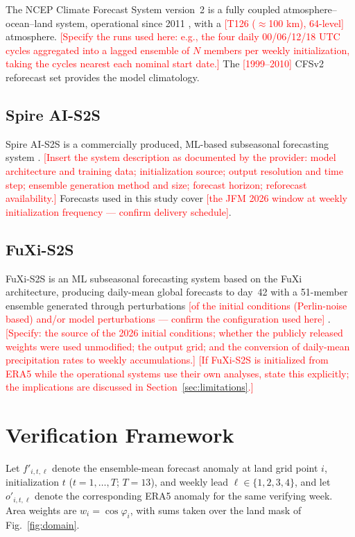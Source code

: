 \documentclass[11pt]{article}
\newcommand{\ph}[1]{\textcolor{red}{[#1]}}
\begin{document}
The NCEP Climate Forecast System version~2 is a fully coupled
atmosphere--ocean--land system, operational since 2011
\citep{saha2014}, with a \ph{T126 ($\approx$100 km), 64-level}
atmosphere. \ph{Specify the runs used here: e.g., the four daily
00/06/12/18 UTC cycles aggregated into a lagged ensemble of $N$ members
per weekly initialization, taking the cycles nearest each nominal
start date.} The \ph{1999--2010} CFSv2 reforecast set provides the
model climatology.

\subsection{Spire AI-S2S}\label{sec:spire}

Spire AI-S2S is a commercially produced, ML-based subseasonal
forecasting system \citep{spire2026}. \ph{Insert the system
description as documented by the provider: model architecture and
training data; initialization source; output resolution and time step;
ensemble generation method and size; forecast horizon; reforecast
availability.} Forecasts used in this study cover \ph{the JFM 2026
window at weekly initialization frequency --- confirm delivery
schedule}.

\subsection{FuXi-S2S}\label{sec:fuxi}

FuXi-S2S is an ML subseasonal forecasting system based on the FuXi
architecture, producing daily-mean global forecasts to day~42 with a
51-member ensemble generated through perturbations \ph{of the initial
conditions (Perlin-noise based) and/or model perturbations --- confirm
the configuration used here} \citep{chen2024}. \ph{Specify: the source
of the 2026 initial conditions; whether the publicly released weights
were used unmodified; the output grid; and the conversion of
daily-mean precipitation rates to weekly accumulations.} \ph{If
FuXi-S2S is initialized from ERA5 while the operational systems use
their own analyses, state this explicitly; the implications are
discussed in Section~\ref{sec:limitations}.}

\section{Verification Framework}\label{sec:verif}

Let $f'_{i,t,\ell}$ denote the ensemble-mean forecast anomaly at land
grid point $i$, initialization $t$ ($t=1,\dots,T$; $T=13$), and weekly
lead $\ell\in\{1,2,3,4\}$, and let $o'_{i,t,\ell}$ denote the
corresponding ERA5 anomaly for the same verifying week. Area weights
are $w_i=\cos\varphi_i$, with sums taken over the land mask of
Fig.~\ref{fig:domain}.
\end{document}
